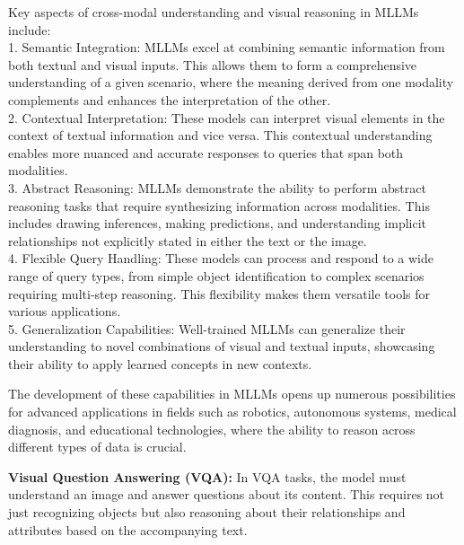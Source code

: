 Key aspects of cross-modal understanding and visual reasoning in MLLMs include:
\\
1. Semantic Integration: MLLMs excel at combining semantic information from both textual and visual inputs. This allows them to form a comprehensive understanding of a given scenario, where the meaning derived from one modality complements and enhances the interpretation of the other.
\\
2. Contextual Interpretation: These models can interpret visual elements in the context of textual information and vice versa. This contextual understanding enables more nuanced and accurate responses to queries that span both modalities.
\\
3. Abstract Reasoning: MLLMs demonstrate the ability to perform abstract reasoning tasks that require synthesizing information across modalities. This includes drawing inferences, making predictions, and understanding implicit relationships not explicitly stated in either the text or the image.
\\
4. Flexible Query Handling: These models can process and respond to a wide range of query types, from simple object identification to complex scenarios requiring multi-step reasoning. This flexibility makes them versatile tools for various applications.
\\
5. Generalization Capabilities: Well-trained MLLMs can generalize their understanding to novel combinations of visual and textual inputs, showcasing their ability to apply learned concepts in new contexts.

The development of these capabilities in MLLMs opens up numerous possibilities for advanced applications in fields such as robotics, autonomous systems, medical diagnosis, and educational technologies, where the ability to reason across different types of data is crucial.

\textbf{Visual Question Answering (VQA):} In VQA tasks, the model must understand an image and answer questions about its content. This requires not just recognizing objects but also reasoning about their relationships and attributes based on the accompanying text.

